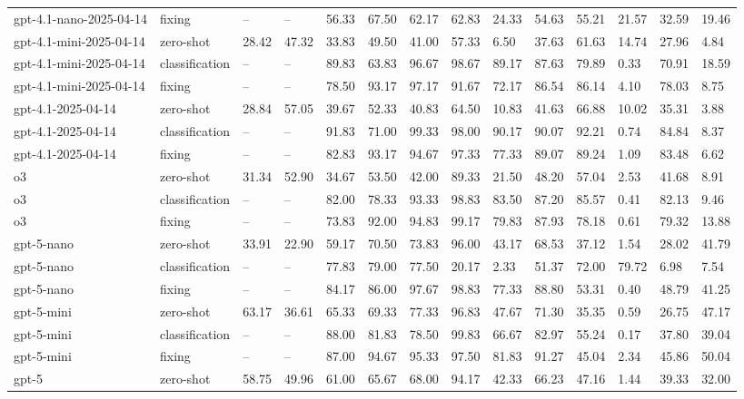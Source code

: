 \begin{table}[!t]
\begin{tabular}{llllllllllllll}
gpt-4.1-nano-2025-04-14 & fixing & -- & -- & 56.33 & 67.50 & 62.17 & 62.83 & 24.33 & 54.63 & 55.21 & 21.57 & 32.59 & 19.46 \\
gpt-4.1-mini-2025-04-14 & zero-shot & 28.42 & 47.32 & 33.83 & 49.50 & 41.00 & 57.33 & 6.50 & 37.63 & 61.63 & 14.74 & 27.96 & 4.84 \\
gpt-4.1-mini-2025-04-14 & classification & -- & -- & 89.83 & 63.83 & 96.67 & 98.67 & 89.17 & 87.63 & 79.89 & 0.33 & 70.91 & 18.59 \\
gpt-4.1-mini-2025-04-14 & fixing & -- & -- & 78.50 & 93.17 & 97.17 & 91.67 & 72.17 & 86.54 & 86.14 & 4.10 & 78.03 & 8.75 \\
gpt-4.1-2025-04-14 & zero-shot & 28.84 & 57.05 & 39.67 & 52.33 & 40.83 & 64.50 & 10.83 & 41.63 & 66.88 & 10.02 & 35.31 & 3.88 \\
gpt-4.1-2025-04-14 & classification & -- & -- & 91.83 & 71.00 & 99.33 & 98.00 & 90.17 & 90.07 & 92.21 & 0.74 & 84.84 & 8.37 \\
gpt-4.1-2025-04-14 & fixing & -- & -- & 82.83 & 93.17 & 94.67 & 97.33 & 77.33 & 89.07 & 89.24 & 1.09 & 83.48 & 6.62 \\
o3 & zero-shot & 31.34 & 52.90 & 34.67 & 53.50 & 42.00 & 89.33 & 21.50 & 48.20 & 57.04 & 2.53 & 41.68 & 8.91 \\
o3 & classification & -- & -- & 82.00 & 78.33 & 93.33 & 98.83 & 83.50 & 87.20 & 85.57 & 0.41 & 82.13 & 9.46 \\
o3 & fixing & -- & -- & 73.83 & 92.00 & 94.83 & 99.17 & 79.83 & 87.93 & 78.18 & 0.61 & 79.32 & 13.88 \\
gpt-5-nano & zero-shot & 33.91 & 22.90 & 59.17 & 70.50 & 73.83 & 96.00 & 43.17 & 68.53 & 37.12 & 1.54 & 28.02 & 41.79 \\
gpt-5-nano & classification & -- & -- & 77.83 & 79.00 & 77.50 & 20.17 & 2.33 & 51.37 & 72.00 & 79.72 & 6.98 & 7.54 \\
gpt-5-nano & fixing & -- & -- & 84.17 & 86.00 & 97.67 & 98.83 & 77.33 & 88.80 & 53.31 & 0.40 & 48.79 & 41.25 \\
gpt-5-mini & zero-shot & 63.17 & 36.61 & 65.33 & 69.33 & 77.33 & 96.83 & 47.67 & 71.30 & 35.35 & 0.59 & 26.75 & 47.17 \\
gpt-5-mini & classification & -- & -- & 88.00 & 81.83 & 78.50 & 99.83 & 66.67 & 82.97 & 55.24 & 0.17 & 37.80 & 39.04 \\
gpt-5-mini & fixing & -- & -- & 87.00 & 94.67 & 95.33 & 97.50 & 81.83 & 91.27 & 45.04 & 2.34 & 45.86 & 50.04 \\
gpt-5 & zero-shot & 58.75 & 49.96 & 61.00 & 65.67 & 68.00 & 94.17 & 42.33 & 66.23 & 47.16 & 1.44 & 39.33 & 32.00 \\

\end{tabular}
\end{table}
